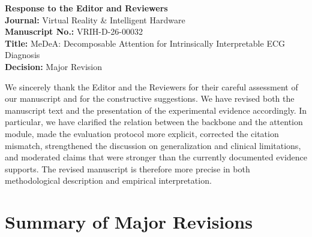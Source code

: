 \documentclass[11pt]{article}
\newcommand{\journalname}{Virtual Reality \& Intelligent Hardware}
\newcommand{\manuscriptnumber}{VRIH-D-26-00032}
\newcommand{\manuscripttitle}{MeDeA: Decomposable Attention for Intrinsically Interpretable ECG Diagnosis}
\begin{document}
\begin{center}
{\Large \textbf{Response to the Editor and Reviewers}}\\[0.6em]
{\normalsize \textbf{Journal:} \journalname}\\
{\normalsize \textbf{Manuscript No.:} \manuscriptnumber}\\
{\normalsize \textbf{Title:} \manuscripttitle}\\
{\normalsize \textbf{Decision:} Major Revision}
\end{center}

We sincerely thank the Editor and the Reviewers for their careful assessment of our manuscript and for the constructive suggestions. We have revised both the manuscript text and the presentation of the experimental evidence accordingly. In particular, we have clarified the relation between the backbone and the attention module, made the evaluation protocol more explicit, corrected the citation mismatch, strengthened the discussion on generalization and clinical limitations, and moderated claims that were stronger than the currently documented evidence supports. The revised manuscript is therefore more precise in both methodological description and empirical interpretation.

\section*{Summary of Major Revisions}
\end{document}
